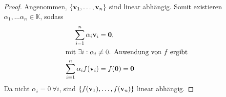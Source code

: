 \documentclass{../mfa}
\begin{document}
\subsection{}

\begin{proof}
   Angenommen, $\{\mathbf{v}_{1}, \ldots, \mathbf{v}_{n}\}$ sind linear abhängig. Somit existieren
   $\alpha_1, \ldots \alpha_n \in \mathbb{K}$, sodass
   \begin{align*}
      \sum_{i=1}^n \alpha_i \mathbf{v}_{i} &= \mathbf{0},\\
      \intertext{mit $\exists i : \alpha_i \neq 0$. Anwendung von $f$ ergibt}
      \sum_{i=1}^n \alpha_i f(\mathbf{v}_{i}) &= f(\mathbf{0}) = \mathbf{0}\\
   \end{align*}
   Da nicht $\alpha_i = 0 ~\forall i$, sind $\{f(\mathbf{v}_{1}), \ldots, f(\mathbf{v}_{n})\}$
   linear abhängig.
\end{proof}

\subsection{}
\end{document}
